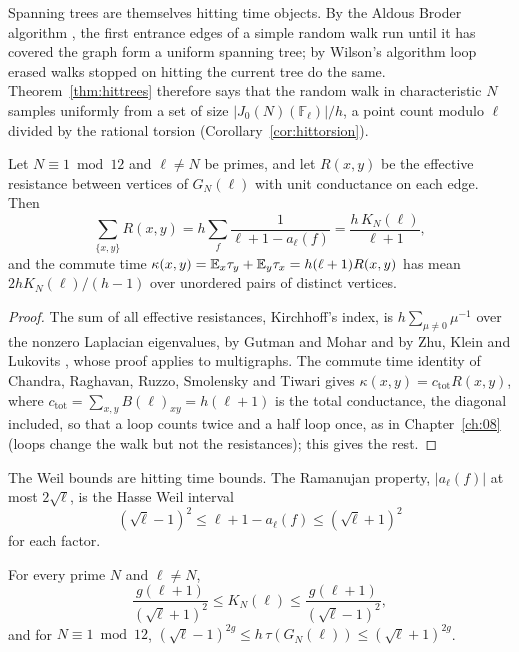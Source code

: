 Spanning trees are themselves hitting time objects. By the Aldous Broder algorithm \cite{aldous1990,broder1989}, the first entrance edges of a simple random walk run until it has covered the graph form a uniform spanning tree; by Wilson's algorithm \cite{wilson1996} loop erased walks stopped on hitting the current tree do the same. Theorem~\ref{thm:hittrees} therefore says that the random walk in characteristic $N$ samples uniformly from a set of size $|J_0(N)(\mathbb F_\ell)|/h$, a point count modulo $\ell$ divided by the rational torsion (Corollary~\ref{cor:hittorsion}).

\begin{theorem}\label{thm:hitresist}
Let $N\equiv1\bmod12$ and $\ell\ne N$ be primes, and let $R(x,y)$ be the effective resistance between vertices of $G_N(\ell)$ with unit conductance on each edge. Then
\[
\sum_{\{x,y\}}R(x,y)=h\sum_f\frac1{\ell+1-a_\ell(f)}=\frac{h\,K_N(\ell)}{\ell+1},
\]
and the commute time $\kappa(x,y)=\mathbb{E}_x\tau_y+\mathbb{E}_y\tau_x=h(\ell+1)R(x,y)$ has mean $2hK_N(\ell)/(h-1)$ over unordered pairs of distinct vertices.
\end{theorem}

\begin{proof}
The sum of all effective resistances, Kirchhoff's index, is $h\sum_{\mu\ne0}\mu^{-1}$ over the nonzero Laplacian eigenvalues, by Gutman and Mohar and by Zhu, Klein and Lukovits \cite{gutmanmohar1996,zhukleinlukovits1996}, whose proof applies to multigraphs. The commute time identity of Chandra, Raghavan, Ruzzo, Smolensky and Tiwari \cite{chandra1996} gives $\kappa(x,y)=c_{\mathrm{tot}}R(x,y)$, where $c_{\mathrm{tot}}=\sum_{x,y}B(\ell)_{xy}=h(\ell+1)$ is the total conductance, the diagonal included, so that a loop counts twice and a half loop once, as in Chapter~\ref{ch:08} (loops change the walk but not the resistances); this gives the rest.
\end{proof}

The Weil bounds are hitting time bounds. The Ramanujan property, $|a_\ell(f)|$ at most $2\sqrt\ell$, is the Hasse Weil interval
\[
(\sqrt\ell-1)^2\le\ell+1-a_\ell(f)\le(\sqrt\ell+1)^2
\]
for each factor.

\begin{corollary}\label{cor:hithasse}
For every prime $N$ and $\ell\ne N$,
\[
\frac{g(\ell+1)}{(\sqrt\ell+1)^2}\le K_N(\ell)\le\frac{g(\ell+1)}{(\sqrt\ell-1)^2},
\]
and for $N\equiv1\bmod12$, $(\sqrt\ell-1)^{2g}\le h\,\tau(G_N(\ell))\le(\sqrt\ell+1)^{2g}$.
\end{corollary}

